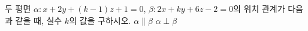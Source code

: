 두 평면 $\alpha\colon x+2y+(k-1)z+1=0$, $\beta\colon 2x+ky+6z-2=0$의 위치 관계가 다음과 같을 때, 실수 $k$의 값을 구하시오.
 $\alpha\parallel\beta$
 $\alpha\perp\beta$
